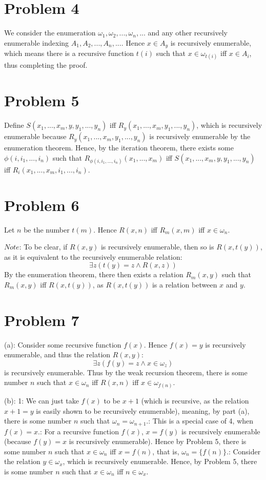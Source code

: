 \documentclass{article}
\theoremstyle{definition}
\begin{document}
\section*{Problem 4}
We consider the enumeration $\omega_1,\omega_2,...,\omega_n,...$ and any other recursively enumerable indexing $A_1,A_2,...,A_n,...$. Hence 
$x\in A_y$ is recursively enumerable, which means there is a recursive function $t(i)$ such that $x\in\omega_{t(i)}$ iff $x\in A_i$, thus completing the proof.

\section*{Problem 5}
Define $S(x_1,...,x_m,y,y_1,...,y_n)$ iff $R_y(x_1,...,x_m,y_1,...,y_n)$, which is recursively enumerable because $R_y(x_1,...,x_m,y_1,...,y_n)$ is recursively enumerable 
by the enumeration theorem. Hence, by the iteration theorem, there exists some $\phi(i,i_1,...,i_n)$ such that $R_{\phi(i,i_1,...,i_n)}(x_1,...,x_m)$ iff
$S(x_1,...,x_m,y,y_1,...,y_n)$ iff $R_i(x_1,...,x_m,i_1,...,i_n)$.

\section*{Problem 6}
Let $n$ be the number $t(m)$. Hence $R(x,n)$ iff $R_m(x,m)$ iff $x\in\omega_{n}$.


$Note$: To be clear, if $R(x,y)$ is recursively enumerable, then so is $R(x,t(y))$, as it is equivalent to the recursively enumerable relation:
\[ \exists z(t(y)=z\wedge R(x,z)) \] By the enumeration theorem, there then exists a relation $R_m(x,y)$ such that $R_m(x,y)$ iff $R(x,t(y))$, as $R(x,t(y))$ is a 
relation between $x$ and $y$.

\section*{Problem 7}
(a): Consider some recursive function $f(x)$. Hence $f(x)=y$ is recursively enumerable, and thus the relation $R(x,y)$:
\[ \exists z(f(y)=z\wedge x\in\omega_z) \] is recursively enumerable. Thus by the weak recursion theorem, there is some number $n$ such that
$x\in\omega_n$ iff $R(x,n)$ iff $x\in\omega_{f(n)}$.


(b):
1: We can just take $f(x)$ to be $x+1$ (which is recursive, as the relation $x+1=y$ is easily shown to be recursively enumerable), meaning, 
by part (a), there is some number $n$ such that $\omega_n=\omega_{n+1}$.: This is a special case of 4, when $f(x)=x$.: For a recursive function $f(x)$, $x=f(y)$ is recursively enumerable (because $f(y)=x$ is recursively enumerable). Hence by Problem 5, there is some number $n$ 
such that $x\in\omega_n$ iff $x=f(n)$, that is, $\omega_n=\{f(n)\}$.: Consider the relation $y\in\omega_x$, which is recursively enumerable. Hence, by Problem 5, there is some number $n$ such that 
$x\in\omega_n$ iff $n\in\omega_x$.
\end{document}
